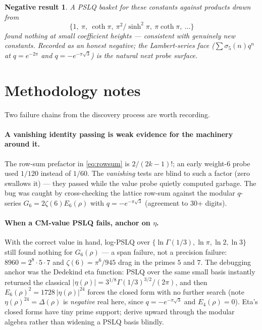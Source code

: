 \documentclass[11pt]{article}
\newtheorem{negative}[result]{Negative result}
\theoremstyle{remark}
\begin{document}
\begin{negative}\label{neg:opaque}
A PSLQ basket for these constants against products drawn from
\[
\{1,\ \pi,\ \coth\pi,\ \pi^2/\sinh^2\pi,\ \pi\coth\pi,\ \dots\}
\]
found nothing at small coefficient heights --- consistent with genuinely new constants.
Recorded as an honest negative; the Lambert-series face ($\sum\sigma_5(n)q^n$ at
$q=e^{-2\pi}$ and $q=-e^{-\pi\sqrt3}$) is the natural next probe surface.
\end{negative}

\section{Methodology notes}\label{sec:method}

Two failure chains from the discovery process are worth recording.

\paragraph{A vanishing identity passing is weak evidence for the machinery around it.}
The row-sum prefactor in \eqref{eq:rowsum} is $2/(2k-1)!$; an early weight-$6$ probe used
$1/120$ instead of $1/60$. The \emph{vanishing} tests are blind to such a factor (zero
swallows it) --- they passed while the value probe quietly computed garbage. The bug was
caught by cross-checking the lattice row-sum against the modular $q$-series
$G_6=2\zeta(6)E_6(\rho)$ with $q=-e^{-\pi\sqrt3}$ (agreement to $30$+ digits).

\paragraph{When a CM-value PSLQ fails, anchor on $\eta$.}
With the correct value in hand, log-PSLQ over $\{\ln\Gamma(1/3),\ln\pi,\ln2,\ln3\}$ still
found nothing for $G_6(\rho)$ --- a span failure, not a precision failure:
$8960=2^8\cdot5\cdot7$ and $\zeta(6)=\pi^6/945$ drag in the primes $5$ and $7$. The
debugging anchor was the Dedekind eta function: PSLQ over the same small basis instantly
returned the classical $|\eta(\rho)|=3^{1/8}\Gamma(1/3)^{3/2}/(2\pi)$, and then
$E_6(\rho)^2=1728\,|\eta(\rho)|^{24}$ forces the closed form with no further search
(note $\eta(\rho)^{24}=\Delta(\rho)$ is \emph{negative} real here, since
$q=-e^{-\pi\sqrt3}$ and $E_4(\rho)=0$). Eta's
closed forms have tiny prime support; derive upward through the modular algebra rather than
widening a PSLQ basis blindly.
\end{document}
